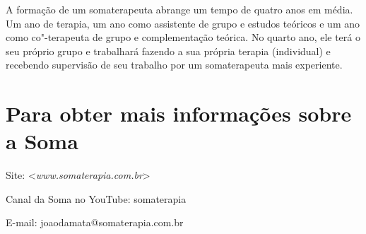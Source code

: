 A formação de um somaterapeuta abrange um tempo de quatro anos em média.
Um ano de terapia, um ano como assistente de grupo e estudos teóricos e
um ano como co"-terapeuta de grupo e complementação teórica. No quarto
ano, ele terá o seu próprio grupo e trabalhará fazendo a sua própria
terapia (individual) e recebendo supervisão de seu trabalho por um
somaterapeuta mais experiente.

\section*{Para obter mais informações sobre a Soma}

Site:
\textless{}\emph{www.somaterapia.com.br}\textgreater{}

Canal da Soma no YouTube: somaterapia

E-mail: joaodamata@somaterapia.com.br
